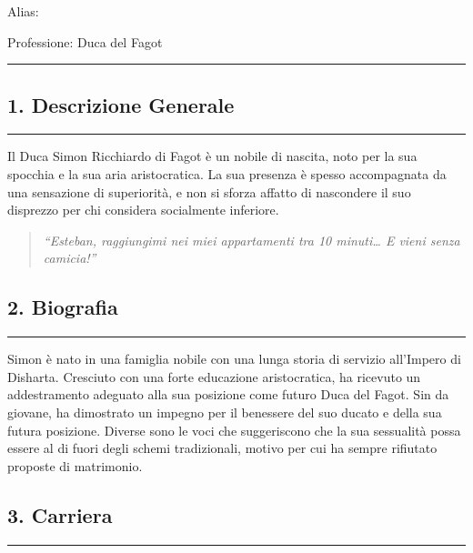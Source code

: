 Alias:

Professione: Duca del Fagot

\begin{center}\rule{0.5\linewidth}{0.5pt}\end{center}

\subsection{1. Descrizione Generale}\label{descrizione-generale}

\begin{center}\rule{0.5\linewidth}{0.5pt}\end{center}

Il Duca Simon Ricchiardo di Fagot è un nobile di nascita, noto per la
sua spocchia e la sua aria aristocratica. La sua presenza è spesso
accompagnata da una sensazione di superiorità, e non si sforza affatto
di nascondere il suo disprezzo per chi considera socialmente inferiore.

\begin{quote}
\emph{``Esteban, raggiungimi nei miei appartamenti tra 10 minuti\ldots{}
E vieni senza camicia!''}
\end{quote}

\subsection{2. Biografia}\label{biografia}

\begin{center}\rule{0.5\linewidth}{0.5pt}\end{center}

Simon è nato in una famiglia nobile con una lunga storia di servizio
all'Impero di Disharta. Cresciuto con una forte educazione
aristocratica, ha ricevuto un addestramento adeguato alla sua posizione
come futuro Duca del Fagot. Sin da giovane, ha dimostrato un impegno per
il benessere del suo ducato e della sua futura posizione. Diverse sono
le voci che suggeriscono che la sua sessualità possa essere al di fuori
degli schemi tradizionali, motivo per cui ha sempre rifiutato proposte
di matrimonio.

\subsection{3. Carriera}\label{carriera}

\begin{center}\rule{0.5\linewidth}{0.5pt}\end{center}

